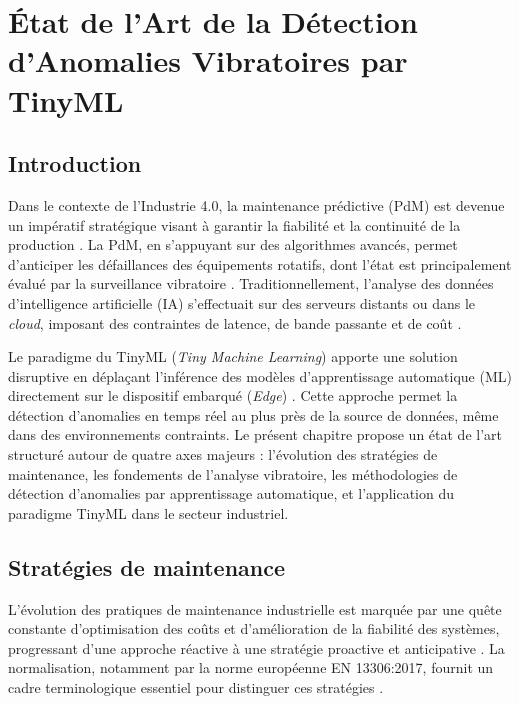\chapter[État de l'Art]{État de l'Art de la Détection d'Anomalies Vibratoires par TinyML}
\label{chap:etat_art}
\thispagestyle{plain}

\section{Introduction}
\label{sec:intro_etat_art}

Dans le contexte de l'Industrie 4.0, la maintenance prédictive (PdM) est devenue un impératif stratégique visant à garantir la fiabilité et la continuité de la production \cite{hector2024,achouch2022}. La PdM, en s'appuyant sur des algorithmes avancés, permet d'anticiper les défaillances des équipements rotatifs, dont l'état est principalement évalué par la surveillance vibratoire \cite{ran2019}. Traditionnellement, l'analyse des données d'intelligence artificielle (IA) s'effectuait sur des serveurs distants ou dans le \textit{cloud}, imposant des contraintes de latence, de bande passante et de coût \cite{njor2024}.

Le paradigme du TinyML (\textit{Tiny Machine Learning}) apporte une solution disruptive en déplaçant l'inférence des modèles d'apprentissage automatique (ML) directement sur le dispositif embarqué (\textit{Edge}) \cite{tsoukas2024}. Cette approche permet la détection d'anomalies en temps réel au plus près de la source de données, même dans des environnements contraints. Le présent chapitre propose un état de l'art structuré autour de quatre axes majeurs : l'évolution des stratégies de maintenance, les fondements de l'analyse vibratoire, les méthodologies de détection d'anomalies par apprentissage automatique, et l'application du paradigme TinyML dans le secteur industriel.

\section{Stratégies de maintenance}
\label{sec:strategies_maintenance}

L'évolution des pratiques de maintenance industrielle est marquée par une quête constante d'optimisation des coûts et d'amélioration de la fiabilité des systèmes, progressant d'une approche réactive à une stratégie proactive et anticipative \cite{ran2019}. La normalisation, notamment par la norme européenne EN 13306:2017, fournit un cadre terminologique essentiel pour distinguer ces stratégies \cite{en13306}.

